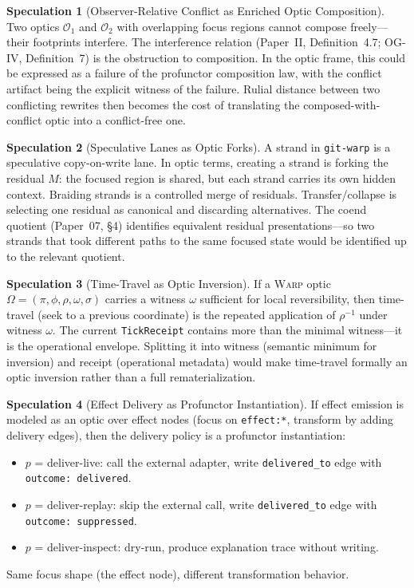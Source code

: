 \documentclass[11pt]{article}
\newcommand{\WARP}{\textsc{Warp}}
\theoremstyle{definition}
\newtheorem{speculation}{Speculation}
\begin{document}
\begin{speculation}[Observer-Relative Conflict as Enriched Optic Composition]
Two optics $\mathcal{O}_1$ and $\mathcal{O}_2$ with overlapping focus
regions cannot compose freely---their footprints interfere. The
interference relation (Paper~II, Definition~4.7; OG-IV, Definition~7)
is the obstruction to composition. In the optic frame, this could be
expressed as a failure of the profunctor composition law, with the
conflict artifact being the explicit witness of the failure. Rulial
distance between two conflicting rewrites then becomes the cost of
translating the composed-with-conflict optic into a conflict-free one.
\end{speculation}

\begin{speculation}[Speculative Lanes as Optic Forks]
A strand in \texttt{git-warp} is a speculative copy-on-write lane. In
optic terms, creating a strand is forking the residual $M$: the
focused region is shared, but each strand carries its own hidden
context. Braiding strands is a controlled merge of residuals.
Transfer/collapse is selecting one residual as canonical and discarding
alternatives. The coend quotient (Paper~07, \S4) identifies equivalent
residual presentations---so two strands that took different paths to
the same focused state would be identified up to the relevant
quotient.
\end{speculation}

\begin{speculation}[Time-Travel as Optic Inversion]
If a \WARP{} optic $\Omega = (\pi, \phi, \rho, \omega, \sigma)$
carries a witness $\omega$ sufficient for local reversibility, then
time-travel (seek to a previous coordinate) is the repeated
application of $\rho^{-1}$ under witness $\omega$. The current
\texttt{TickReceipt} contains more than the minimal witness---it is
the operational envelope. Splitting it into witness (semantic minimum
for inversion) and receipt (operational metadata) would make time-travel
formally an optic inversion rather than a full rematerialization.
\end{speculation}

\begin{speculation}[Effect Delivery as Profunctor Instantiation]
If effect emission is modeled as an optic over effect nodes (focus on
\texttt{effect:*}, transform by adding delivery edges), then the
delivery policy is a profunctor instantiation:
\begin{itemize}[leftmargin=2em]
\item $p$ = deliver-live: call the external adapter, write
  \texttt{delivered\_to} edge with \texttt{outcome: delivered}.
\item $p$ = deliver-replay: skip the external call, write
  \texttt{delivered\_to} edge with \texttt{outcome: suppressed}.
\item $p$ = deliver-inspect: dry-run, produce explanation trace
  without writing.
\end{itemize}
Same focus shape (the effect node), different transformation behavior.
\end{speculation}
\end{document}
